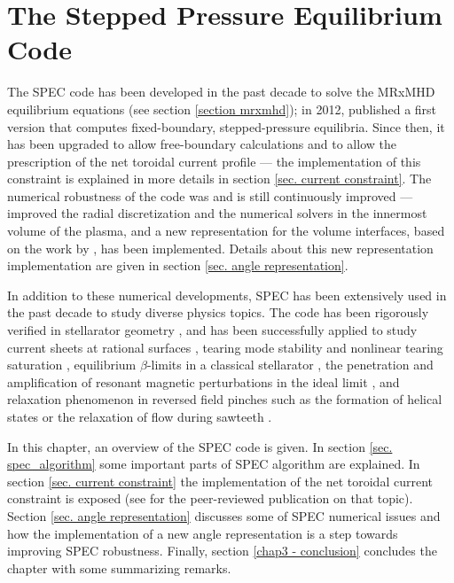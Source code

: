 \documentclass[my_thesis.tex]{subfiles}
\begin{document}
\chapter{The Stepped Pressure Equilibrium Code}\label{ch3.SPEC}

The SPEC code has been developed in the past decade to solve the MRxMHD equilibrium equations (see section \ref{section mrxmhd}); in 2012, \citet{Hudson2012} published a first version that computes fixed-boundary, stepped-pressure equilibria. Since then, it has been upgraded to allow free-boundary calculations \citep{Hudson2020c} and to allow the prescription of the net toroidal current profile \citep{Baillod2021} --- the implementation of this constraint is explained in more details in section \ref{sec. current constraint}. The numerical robustness of the code was and is still continuously improved --- \citet{Qu2020} improved the radial discretization and the numerical solvers in the innermost volume of the plasma, and a new representation for the volume interfaces, based on the work by \citet{Henneberg2021}, has been implemented. Details about this new representation implementation are given in section \ref{sec. angle representation}.

In addition to these numerical developments, SPEC has been extensively used in the past decade to study diverse physics topics. The code has been rigorously verified in stellarator geometry \citep{Loizu2016}, and has been successfully applied to study current sheets at rational surfaces \citep{Loizu2015,Loizu2015a,Huang2021}, tearing mode stability \citep{Loizu2019} and nonlinear tearing saturation \citep{Loizu2020}, equilibrium $\beta$-limits in a classical stellarator \citep{Loizu2017}, the penetration and amplification of resonant magnetic perturbations in the ideal limit \citep{Loizu2016}, and relaxation phenomenon in reversed field pinches such as the formation of helical states \citep{Dennis2013a} or the relaxation of flow during sawteeth \citep{Dennis2014,Qu2020}. 


In this chapter, an overview of the SPEC code is given. In section \ref{sec. spec_algorithm} some important parts of SPEC algorithm are explained. In section \ref{sec. current constraint} the implementation of the net toroidal current constraint is exposed (see \citep{Baillod2021} for the peer-reviewed publication on that topic). Section \ref{sec. angle representation} discusses some of SPEC numerical issues and how the implementation of a new angle representation is a step towards improving SPEC robustness. Finally, section \ref{chap3 - conclusion} concludes the chapter with some summarizing remarks.
\end{document}
